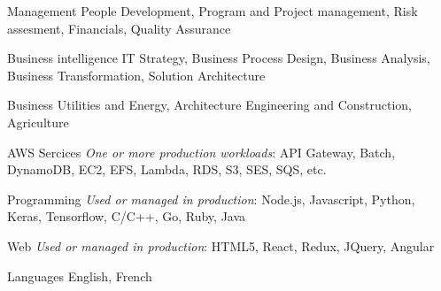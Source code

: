 
\begin{cvskills}

  \cvskill
    {Management} %
    {People Development, Program and Project management, Risk assesment, Financials, Quality Assurance} %

  \cvskill
    {Business intelligence} %
    {IT Strategy, Business Process Design, Business Analysis, Business Transformation, Solution Architecture} %

  \cvskill
    {Business} %
    {Utilities and Energy, Architecture Engineering and Construction, Agriculture} %

  \cvskill
    {AWS Sercices} %
    {\textit{One or more production workloads}: API Gateway, Batch, DynamoDB, EC2, EFS, Lambda, RDS, S3, SES, SQS, etc.} %

  \cvskill
    {Programming} %
    {\textit{Used or managed in production}: Node.js, Javascript, Python, Keras, Tensorflow, C/C++, Go, Ruby, Java} %

  \cvskill
    {Web} %
    {\textit{Used or managed in production}: HTML5, React, Redux, JQuery, Angular} %

  \cvskill
    {Languages} %
    {English, French} %

\end{cvskills}
